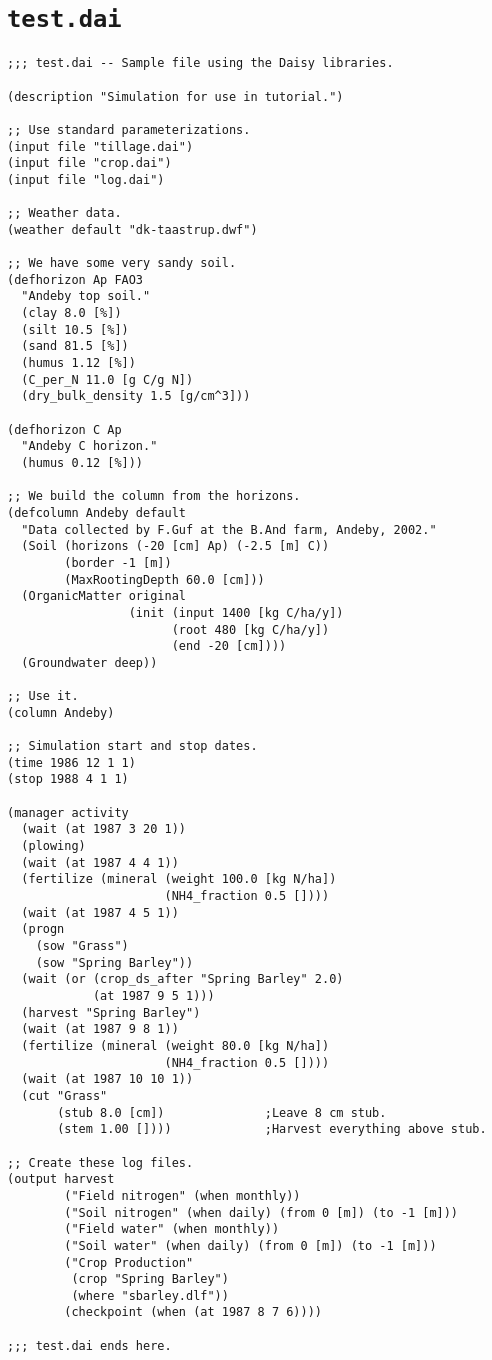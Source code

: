 \documentclass[a4paper]{article}
\begin{document}
\section{\texttt{test.dai}}
\label{app:test}

\begin{verbatim}
;;; test.dai -- Sample file using the Daisy libraries.

(description "Simulation for use in tutorial.")

;; Use standard parameterizations.
(input file "tillage.dai")
(input file "crop.dai")
(input file "log.dai")

;; Weather data.
(weather default "dk-taastrup.dwf")

;; We have some very sandy soil.
(defhorizon Ap FAO3
  "Andeby top soil."
  (clay 8.0 [%])
  (silt 10.5 [%])
  (sand 81.5 [%])
  (humus 1.12 [%])
  (C_per_N 11.0 [g C/g N])
  (dry_bulk_density 1.5 [g/cm^3]))

(defhorizon C Ap
  "Andeby C horizon."
  (humus 0.12 [%]))

;; We build the column from the horizons.
(defcolumn Andeby default
  "Data collected by F.Guf at the B.And farm, Andeby, 2002."
  (Soil (horizons (-20 [cm] Ap) (-2.5 [m] C))
        (border -1 [m])
        (MaxRootingDepth 60.0 [cm]))
  (OrganicMatter original
                 (init (input 1400 [kg C/ha/y])
                       (root 480 [kg C/ha/y])
                       (end -20 [cm])))
  (Groundwater deep))

;; Use it.
(column Andeby)

;; Simulation start and stop dates.
(time 1986 12 1 1)
(stop 1988 4 1 1)

(manager activity
  (wait (at 1987 3 20 1))
  (plowing)
  (wait (at 1987 4 4 1))
  (fertilize (mineral (weight 100.0 [kg N/ha])
                      (NH4_fraction 0.5 [])))
  (wait (at 1987 4 5 1))
  (progn
    (sow "Grass")
    (sow "Spring Barley"))
  (wait (or (crop_ds_after "Spring Barley" 2.0)
            (at 1987 9 5 1)))
  (harvest "Spring Barley")
  (wait (at 1987 9 8 1))
  (fertilize (mineral (weight 80.0 [kg N/ha])
                      (NH4_fraction 0.5 [])))
  (wait (at 1987 10 10 1))
  (cut "Grass"
       (stub 8.0 [cm])              ;Leave 8 cm stub.
       (stem 1.00 [])))             ;Harvest everything above stub.

;; Create these log files.
(output harvest
        ("Field nitrogen" (when monthly))
        ("Soil nitrogen" (when daily) (from 0 [m]) (to -1 [m]))
        ("Field water" (when monthly))
        ("Soil water" (when daily) (from 0 [m]) (to -1 [m]))
        ("Crop Production"
         (crop "Spring Barley")
         (where "sbarley.dlf"))
        (checkpoint (when (at 1987 8 7 6))))

;;; test.dai ends here.
\end{verbatim}
\end{document}
